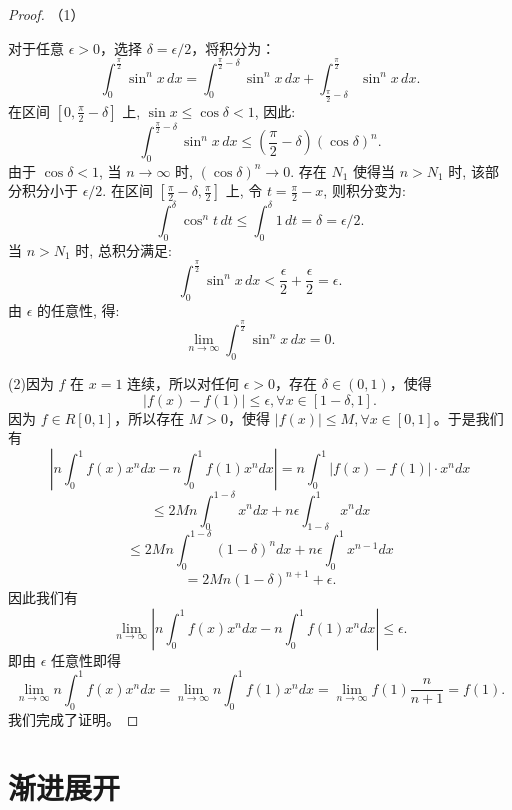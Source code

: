 \documentclass[lang=cn,10pt,thmcnt=section]{elegantbook}
\begin{document}
\begin{proof}
	（1）

	对于任意 $\epsilon > 0$，选择 $\delta = \epsilon / 2$，将积分为：
$$
\int_{0}^{\frac{\pi}{2}} \sin^n x \, dx = \int_{0}^{\frac{\pi}{2} - \delta} \sin^n x \, dx + \int_{\frac{\pi}{2} - \delta}^{\frac{\pi}{2}} \sin^n x \, dx.
$$
在区间 $[0, \frac{\pi}{2} - \delta]$ 上, $\sin x \le \cos \delta < 1$, 因此:
$$
\int_{0}^{\frac{\pi}{2} - \delta} \sin^n x \, dx \le \left(\frac{\pi}{2} - \delta\right) (\cos \delta)^n.
$$
由于 $\cos \delta < 1$, 当 $n \to \infty$ 时, $(\cos \delta)^n \to 0$. 存在 $N_1$ 使得当 $n > N_1$ 时, 该部分积分小于 $\epsilon / 2$.
在区间 $[\frac{\pi}{2} - \delta, \frac{\pi}{2}]$ 上, 令 $t = \frac{\pi}{2} - x$, 则积分变为:
$$
\int_{0}^{\delta} \cos^n t \, dt \le \int_{0}^{\delta} 1 \, dt = \delta = \epsilon / 2.
$$
当 $n > N_1$ 时, 总积分满足:
$$
\int_{0}^{\frac{\pi}{2}} \sin^n x \, dx < \frac{\epsilon}{2} + \frac{\epsilon}{2} = \epsilon.
$$
由 $\epsilon$ 的任意性, 得:
$$
\lim_{n \to \infty} \int_{0}^{\frac{\pi}{2}} \sin^n x \, dx = 0.
$$

	(2)因为 $f$ 在 $x=1$ 连续，所以对任何 $\epsilon > 0$，存在 $\delta \in (0,1)$，使得
	\[
	|f(x) - f(1)| \leq \epsilon, \forall x \in [1-\delta, 1].
	\]
	因为 $f \in R[0,1]$，所以存在 $M > 0$，使得 $|f(x)| \leq M, \forall x \in [0,1]$。于是我们有
	\[
	\left| n \int_0^1 f(x) x^n dx - n \int_0^1 f(1) x^n dx \right| = n \int_0^1 |f(x) - f(1)| \cdot x^n dx
	\]
	\[
	\leq 2Mn \int_0^{1-\delta} x^n dx + n \epsilon \int_{1-\delta}^1 x^n dx
	\]
	\[
	\leq 2Mn \int_0^{1-\delta} (1-\delta)^n dx + n \epsilon \int_0^1 x^{n-1} dx
	\]
	\[
	= 2Mn(1-\delta)^{n+1} + \epsilon.
	\]
	因此我们有
	\[
	\lim_{n \to \infty} \left| n \int_0^1 f(x) x^n dx - n \int_0^1 f(1) x^n dx \right| \leq \epsilon.
	\]
	即由 $\epsilon$ 任意性即得
	\[
	\lim_{n \to \infty} n \int_0^1 f(x) x^n dx = \lim_{n \to \infty} n \int_0^1 f(1) x^n dx = \lim_{n \to \infty} f(1) \frac{n}{n+1} = f(1).
	\]
	我们完成了证明。
\end{proof}
\section{渐进展开}
\end{document}
